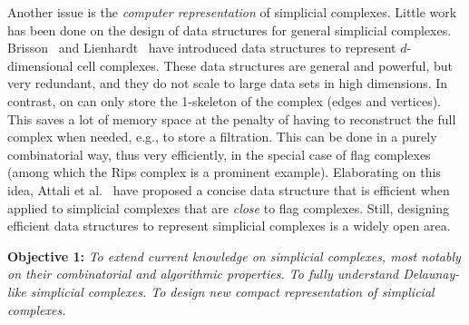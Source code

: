  
Another issue is the {\em computer representation} of simplicial complexes. 
Little work has been done on the design of data structures for general simplicial complexes. Brisson~\cite{Brisson:1989:RGS:73833.73858} and Lienhardt~\cite{DBLP:journals/ijcga/Lienhardt94} have introduced data structures to represent $d$-dimensional cell complexes. These data structures are general and powerful, but very redundant, and they do not scale to large data sets in high dimensions.  In contrast, on can only store the 1-skeleton of the complex (edges and vertices). This 
saves a lot of memory space at the penalty of having to reconstruct the full complex when needed, e.g., to store a filtration. This can be done in a purely combinatorial way, thus very efficiently, in the special case of flag complexes (among which the Rips complex is a prominent example). Elaborating on this idea, Attali et al.~\cite{Attali2011} have proposed a concise data structure that is efficient when applied to simplicial complexes that are {\em close} to flag complexes. Still, designing efficient data structures to represent simplicial complexes is a widely open area.


\vspace{2mm}

{\bf Objective 1:} {\em 
To extend  current knowledge on simplicial complexes, most notably on their combinatorial and algorithmic properties.   To fully understand Delaunay-like simplicial complexes.  To design new  compact representation of simplicial complexes.}

